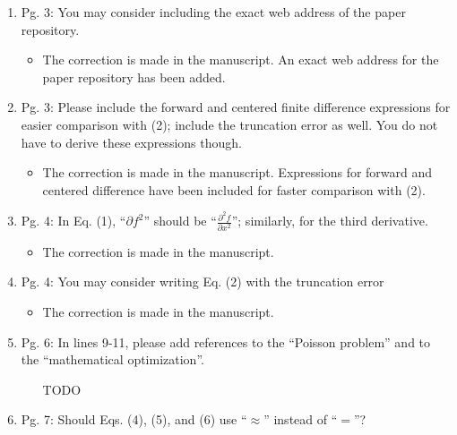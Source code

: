 \documentclass{article}
\begin{document}
\begin{enumerate}
  \item 
Pg. 3: You may consider including the exact web address of the paper repository.

{\color{red}  
\begin{itemize}
     \item
      The correction is made in the manuscript. An exact web address for the paper repository has been added.
  \end{itemize}}

  \item 
    Pg. 3: Please include the forward and centered ﬁnite difference expressions for
    easier comparison with (2); include the truncation error as well. You do not
    have to derive these expressions though.

{\color{red}  
\begin{itemize}
     \item
      The correction is made in the manuscript. Expressions for forward and centered difference have been included for faster comparison with (2).  
  \end{itemize}}

  \item 
Pg. 4: In Eq. (1), “$\partial f^2$” should be “$\frac{\partial^2 f}{\partial x^2}$”; similarly, for the third derivative.

{\color{red}  
\begin{itemize}
     \item
      The correction is made in the manuscript.
  \end{itemize}}

  \item 
Pg. 4: You may consider writing Eq. (2) with the truncation error

{\color{red}  
\begin{itemize}
     \item
      The correction is made in the manuscript.
  \end{itemize}}

\item
Pg. 6: In lines 9-11, please add references to the “Poisson problem” and to the
“mathematical optimization”.

{\color{red}  
\begin{itemize}
     \item
         [TODO]
         
  \end{itemize}}

\item
Pg. 7: Should Eqs. (4), (5), and (6) use “$\approx$” instead of “$=$”?


\end{enumerate}
\end{document}

